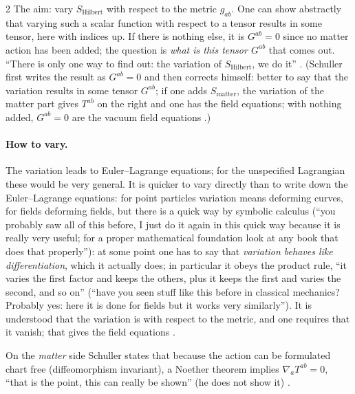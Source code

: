 \begin{paracol}{2}
The aim: vary $S_{\mathrm{Hilbert}}$ with respect to the metric $g_{ab}$. One can show abstractly that varying such a scalar function with respect to a tensor results in some tensor, here with indices up. If there is nothing else, it is $G^{ab}=0$ since no matter action has been added; the question is \emph{what is this tensor $G^{ab}$} that comes out. ``There is only one way to find out: the variation of $S_{\mathrm{Hilbert}}$, we do it'' . (Schuller first writes the result as $G^{ab}=0$ and then corrects himself: better to say that the variation results in some tensor $G^{ab}$; if one adds $S_{\mathrm{matter}}$, the variation of the matter part gives $T^{ab}$ on the right and one has the field equations; with nothing added, $G^{ab}=0$ are the vacuum field equations .)

\paragraph{How to vary.} The variation leads to Euler--Lagrange equations; for the unspecified Lagrangian these would be very general. It is quicker to vary directly than to write down the Euler--Lagrange equations: for point particles variation means deforming curves, for fields deforming fields, but there is a quick way by symbolic calculus (``you probably saw all of this before, I just do it again in this quick way because it is really very useful; for a proper mathematical foundation look at any book that does that properly''): at some point one has to say that \emph{variation behaves like differentiation}, which it actually does; in particular it obeys the product rule, ``it varies the first factor and keeps the others, plus it keeps the first and varies the second, and so on'' (``have you seen stuff like this before in classical mechanics? Probably yes: here it is done for fields but it works very similarly''). It is understood that the variation is with respect to the metric, and one requires that it vanish; that gives the field equations .
\begin{coursenote}
On the \emph{matter} side Schuller states that because the action can be formulated chart free (diffeomorphism invariant), a Noether theorem implies $\nabla_aT^{ab}=0$, ``that is the point, this can really be shown'' (he does not show it) .
\end{coursenote}


\end{paracol}
